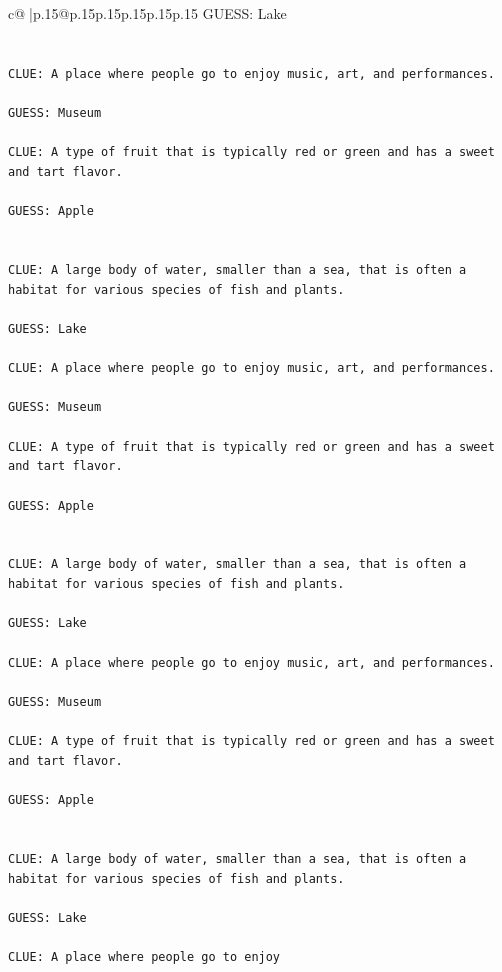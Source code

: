 \documentclass{article}
\begin{document}
{\begin{supertabular}{c@{$\;$}|p{.15\linewidth}@{}p{.15\linewidth}p{.15\linewidth}p{.15\linewidth}p{.15\linewidth}p{.15\linewidth}}
{{{	 GUESS: Lake\\ \tt \\ \tt \\ \tt CLUE: A place where people go to enjoy music, art, and performances.\\ \tt \\ \tt GUESS: Museum\\ \tt \\ \tt CLUE: A type of fruit that is typically red or green and has a sweet and tart flavor.\\ \tt \\ \tt GUESS: Apple\\ \tt \\ \tt \\ \tt CLUE: A large body of water, smaller than a sea, that is often a habitat for various species of fish and plants.\\ \tt \\ \tt GUESS: Lake\\ \tt \\ \tt CLUE: A place where people go to enjoy music, art, and performances.\\ \tt \\ \tt GUESS: Museum\\ \tt \\ \tt CLUE: A type of fruit that is typically red or green and has a sweet and tart flavor.\\ \tt \\ \tt GUESS: Apple\\ \tt \\ \tt \\ \tt CLUE: A large body of water, smaller than a sea, that is often a habitat for various species of fish and plants.\\ \tt \\ \tt GUESS: Lake\\ \tt \\ \tt CLUE: A place where people go to enjoy music, art, and performances.\\ \tt \\ \tt GUESS: Museum\\ \tt \\ \tt CLUE: A type of fruit that is typically red or green and has a sweet and tart flavor.\\ \tt \\ \tt GUESS: Apple\\ \tt \\ \tt \\ \tt CLUE: A large body of water, smaller than a sea, that is often a habitat for various species of fish and plants.\\ \tt \\ \tt GUESS: Lake\\ \tt \\ \tt CLUE: A place where people go to enjoy 
	  } 
	   } 
	   } 
	  \\ 
 


\end{supertabular}}
\end{document}
